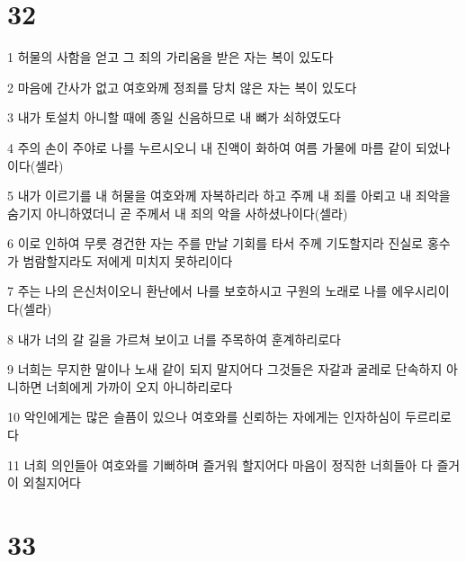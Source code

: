 \chapter{32}

\par 1 허물의 사함을 얻고 그 죄의 가리움을 받은 자는 복이 있도다
\par 2 마음에 간사가 없고 여호와께 정죄를 당치 않은 자는 복이 있도다
\par 3 내가 토설치 아니할 때에 종일 신음하므로 내 뼈가 쇠하였도다
\par 4 주의 손이 주야로 나를 누르시오니 내 진액이 화하여 여름 가물에 마름 같이 되었나이다(셀라)
\par 5 내가 이르기를 내 허물을 여호와께 자복하리라 하고 주께 내 죄를 아뢰고 내 죄악을 숨기지 아니하였더니 곧 주께서 내 죄의 악을 사하셨나이다(셀라)
\par 6 이로 인하여 무릇 경건한 자는 주를 만날 기회를 타서 주께 기도할지라 진실로 홍수가 범람할지라도 저에게 미치지 못하리이다
\par 7 주는 나의 은신처이오니 환난에서 나를 보호하시고 구원의 노래로 나를 에우시리이다(셀라)
\par 8 내가 너의 갈 길을 가르쳐 보이고 너를 주목하여 훈계하리로다
\par 9 너희는 무지한 말이나 노새 같이 되지 말지어다 그것들은 자갈과 굴레로 단속하지 아니하면 너희에게 가까이 오지 아니하리로다
\par 10 악인에게는 많은 슬픔이 있으나 여호와를 신뢰하는 자에게는 인자하심이 두르리로다
\par 11 너희 의인들아 여호와를 기뻐하며 즐거워 할지어다 마음이 정직한 너희들아 다 즐거이 외칠지어다

\chapter{33}

